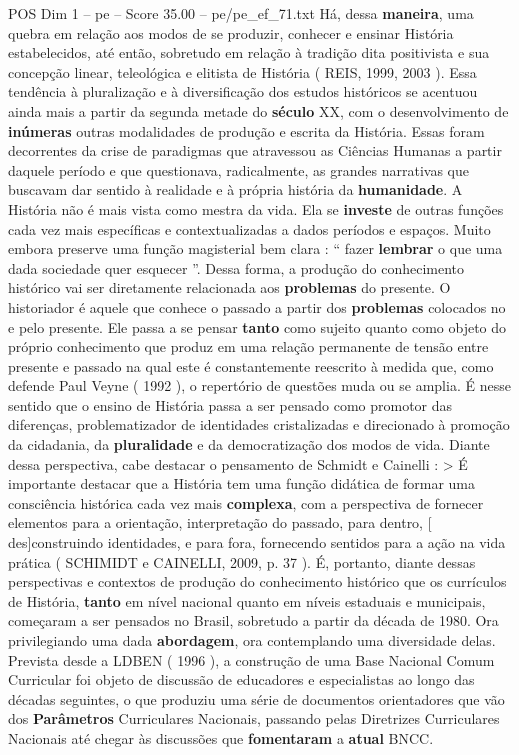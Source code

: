 \begin{textsample}{POS Dim 1 – pe – Score 35.00 – pe/pe\_ef\_71.txt}
Há, dessa \textbf{maneira}, uma quebra em relação aos modos de se produzir, conhecer e ensinar História estabelecidos, até então, sobretudo em relação à tradição dita positivista e sua concepção linear, teleológica e elitista de História ( REIS, 1999, 2003 ).
Essa tendência à pluralização e à diversificação dos estudos históricos se acentuou ainda mais a partir da segunda metade do \textbf{século} XX, com o desenvolvimento de \textbf{inúmeras} outras modalidades de produção e escrita da História.
Essas foram decorrentes da crise de paradigmas que atravessou as Ciências Humanas a partir daquele período e que questionava, radicalmente, as grandes narrativas que buscavam dar sentido à realidade e à própria história da \textbf{humanidade}.
A História não é mais vista como mestra da vida.
Ela se \textbf{investe} de outras funções cada vez mais específicas e contextualizadas a dados períodos e espaços.
Muito embora preserve uma função magisterial bem clara : “ fazer \textbf{lembrar} o que uma dada sociedade quer esquecer ”.
Dessa forma, a produção do conhecimento histórico vai ser diretamente relacionada aos \textbf{problemas} do presente.
O historiador é aquele que conhece o passado a partir dos \textbf{problemas} colocados no e pelo presente.
Ele passa a se pensar \textbf{tanto} como sujeito quanto como objeto do próprio conhecimento que produz em uma relação permanente de tensão entre presente e passado na qual este é constantemente reescrito à medida que, como defende Paul Veyne ( 1992 ), o repertório de questões muda ou se amplia.
É nesse sentido que o ensino de História passa a ser pensado como promotor das diferenças, problematizador de identidades cristalizadas e direcionado à promoção da cidadania, da \textbf{pluralidade} e da democratização dos modos de vida.
Diante dessa perspectiva, cabe destacar o pensamento de Schmidt e Cainelli : > É importante destacar que a História tem uma função didática de formar uma consciência histórica cada vez mais \textbf{complexa}, com a perspectiva de fornecer elementos para a orientação, interpretação do passado, para dentro, [ des]construindo identidades, e para fora, fornecendo sentidos para a ação na vida prática ( SCHIMIDT e CAINELLI, 2009, p. 37 ).
É, portanto, diante dessas perspectivas e contextos de produção do conhecimento histórico que os currículos de História, \textbf{tanto} em nível nacional quanto em níveis estaduais e municipais, começaram a ser pensados no Brasil, sobretudo a partir da década de 1980.
Ora privilegiando uma dada \textbf{abordagem}, ora contemplando uma diversidade delas.
Prevista desde a LDBEN ( 1996 ), a construção de uma Base Nacional Comum Curricular foi objeto de discussão de educadores e especialistas ao longo das décadas seguintes, o que produziu uma série de documentos orientadores que vão dos \textbf{Parâmetros} Curriculares Nacionais, passando pelas Diretrizes Curriculares Nacionais até chegar às discussões que \textbf{fomentaram} a \textbf{atual} BNCC.

\end{textsample}
